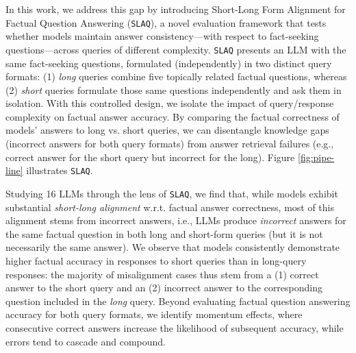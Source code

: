 \documentclass[11pt]{article}
\newcommand{\acrnm}{\texttt{SLAQ}\xspace}
\begin{document}
In this work, we address this gap by introducing Short-Long Form Alignment for Factual Question Answering (\acrnm), a novel evaluation framework that tests whether models maintain answer consistency---with respect to fact-seeking questions---across queries of different complexity. 
\acrnm presents an LLM with the same fact-seeking questions, formulated (independently) in two distinct query formats: (1) \textit{long} queries combine five topically related factual questions, whereas (2) \textit{short} queries formulate those same questions independently and ask them in isolation. 
With this controlled design, we isolate the impact of query/response complexity on factual answer accuracy. 
By comparing the factual correctness of models' answers to long vs. short queries, %
we can disentangle knowledge gaps (incorrect answers for both query formats) from answer retrieval failures (e.g., correct answer for the short query but incorrect for the long). Figure \ref{fig:pipe-line} illustrates \acrnm. 


Studying 16 LLMs through the lens of \acrnm, we find that, while models exhibit substantial \textit{short-long alignment} w.r.t. factual answer correctness, most of this alignment stems from incorrect answers, i.e., LLMs produce \textit{incorrect} answers for the same factual question in both long and short-form queries (but it is not necessarily the same answer).  
We observe that models consistently demonstrate higher factual accuracy in responses to short queries than in long-query responses: the majority of misalignment cases thus stem from a (1) correct answer to the short query and an (2) incorrect answer to the corresponding question included in the \textit{long} query.  
%
%
Beyond evaluating factual question answering accuracy for both query formats, we identify momentum effects, where consecutive correct answers increase the likelihood of subsequent accuracy, while errors tend to cascade and compound.
\end{document}
